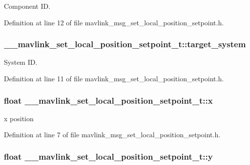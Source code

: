 Component I\-D. 



Definition at line 12 of file mavlink\-\_\-msg\-\_\-set\-\_\-local\-\_\-position\-\_\-setpoint.\-h.

\hypertarget{struct____mavlink__set__local__position__setpoint__t_a1dd8c3bb93acc4aa0aa9524afad5461d}{
\subsubsection[{target\-\_\-system}]{ \-\_\-\-\_\-mavlink\-\_\-set\-\_\-local\-\_\-position\-\_\-setpoint\-\_\-t\-::target\-\_\-system}}\label{struct____mavlink__set__local__position__setpoint__t_a1dd8c3bb93acc4aa0aa9524afad5461d}


System I\-D. 



Definition at line 11 of file mavlink\-\_\-msg\-\_\-set\-\_\-local\-\_\-position\-\_\-setpoint.\-h.

\hypertarget{struct____mavlink__set__local__position__setpoint__t_a72e5f199c95c629fd0d0f3b25bba75e7}{
\subsubsection[{x}]{\setlength{\rightskip}{0pt plus 5cm}float \-\_\-\-\_\-mavlink\-\_\-set\-\_\-local\-\_\-position\-\_\-setpoint\-\_\-t\-::x}}\label{struct____mavlink__set__local__position__setpoint__t_a72e5f199c95c629fd0d0f3b25bba75e7}


x position 



Definition at line 7 of file mavlink\-\_\-msg\-\_\-set\-\_\-local\-\_\-position\-\_\-setpoint.\-h.

\hypertarget{struct____mavlink__set__local__position__setpoint__t_a2f17c52ddd1c9b208933fd174c20f8b5}{
\subsubsection[{y}]{\setlength{\rightskip}{0pt plus 5cm}float \-\_\-\-\_\-mavlink\-\_\-set\-\_\-local\-\_\-position\-\_\-setpoint\-\_\-t\-::y}}\label{struct____mavlink__set__local__position__setpoint__t_a2f17c52ddd1c9b208933fd174c20f8b5}


